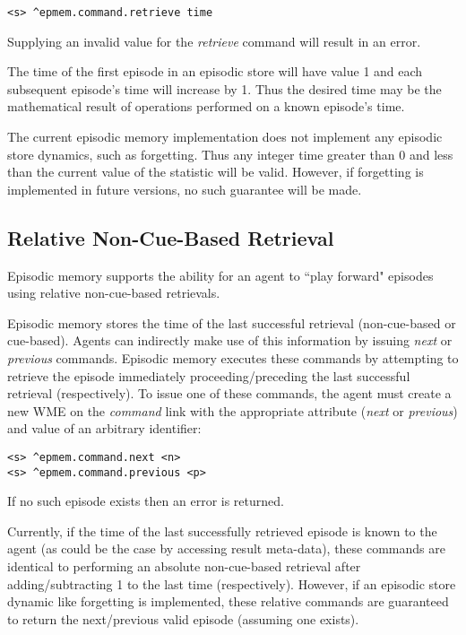\begin{verbatim}
<s> ^epmem.command.retrieve time
\end{verbatim}

Supplying an invalid value for the \emph{retrieve} command will result in an error.

The time of the first episode in an episodic store will have value 1 and each subsequent episode's time will increase by 1.  
Thus the desired time may be the mathematical result of operations performed on a known episode's time.

The current episodic memory implementation does not implement any episodic store dynamics, such as forgetting.  
Thus any integer time greater than 0 and less than the current value of the  statistic will be valid.  
However, if forgetting is implemented in future versions, no such guarantee will be made.

\subsection{Relative Non-Cue-Based Retrieval}
Episodic memory supports the ability for an agent to ``play forward" episodes using relative non-cue-based retrievals. 

Episodic memory stores the time of the last successful retrieval (non-cue-based or cue-based).  
Agents can indirectly make use of this information by issuing \emph{next} or \emph{previous} commands.  
Episodic memory executes these commands by attempting to retrieve the episode immediately proceeding/preceding the last successful retrieval (respectively).  
To issue one of these commands, the agent must create a new WME on the \emph{command} link with the appropriate attribute (\emph{next} or \emph{previous}) and value of an arbitrary identifier:

\begin{verbatim}
<s> ^epmem.command.next <n>
<s> ^epmem.command.previous <p>
\end{verbatim}

If no such episode exists then an error is returned.

Currently, if the time of the last successfully retrieved episode is known to the agent (as could be the case by accessing result meta-data), these commands are identical to performing an absolute non-cue-based retrieval after adding/subtracting 1 to the last time (respectively).  
However, if an episodic store dynamic like forgetting is implemented, these relative commands are guaranteed to return the next/previous valid episode (assuming one exists).


